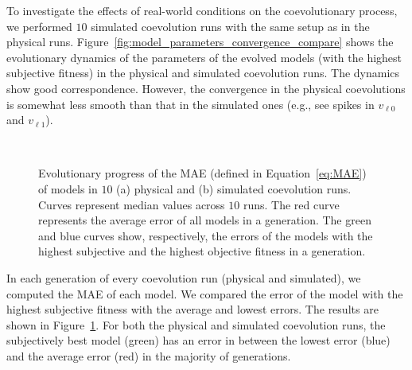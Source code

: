 To investigate the effects of real-world conditions on the coevolutionary process, we performed $10$ simulated coevolution runs with the same setup as in the physical runs. Figure~\ref{fig:model_parameters_convergence_compare} shows the evolutionary dynamics of the parameters of the evolved models (with the highest subjective fitness) in the physical and simulated coevolution runs. The dynamics show good correspondence. However, the convergence in the physical coevolutions is somewhat less smooth than that in the simulated ones (e.g., see spikes in $v_{\ell 0}$ and $v_{\ell 1}$). 
\begin{figure}[!t]%
	\centering
		\\
		\caption{Evolutionary progress of the MAE (defined in Equation~\eqref{eq:MAE}) of models in $10$ (a) physical and (b) simulated coevolution runs. Curves represent median values across $10$ runs. The red curve represents the average error of all models in a generation. The green and blue curves show, respectively, the errors of the models with the highest subjective and the highest objective fitness in a generation.}
		\label{fig:MAE_compare_simulation_physical}
\end{figure}
In each generation of every coevolution run (physical and simulated), we computed the MAE of each model. We compared the error of the model with the highest subjective fitness with the average and lowest errors. The results are shown in Figure~\ref{fig:MAE_compare_simulation_physical}. For both the physical and simulated coevolution runs, the subjectively best model (green) has an error in between the lowest error (blue) and the average error (red) in the majority of generations. 

